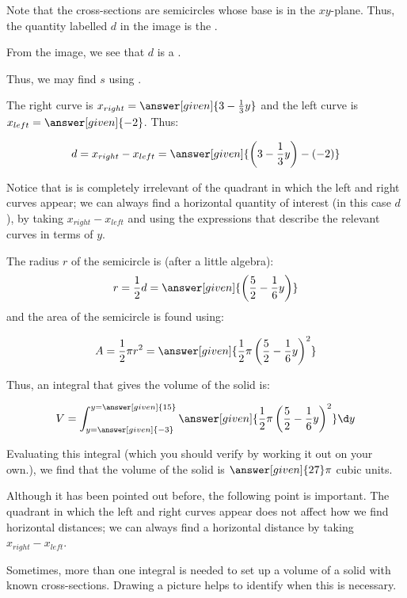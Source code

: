 \documentclass{ximera}
\begin{document}
\begin{example}
\begin{explanation}
Note that the cross-sections are semicircles whose base is in the $xy$-plane.  Thus, the quantity labelled $d$ in the image is the .

From the image, we see that $d$ is a .

Thus, we may find $s$ using .

The right curve is $x_{right} = \answer[given]{3-\frac{1}{3}y}$ and the left curve is $x_{left} = \answer[given]{-2}$.  Thus:

\[
d=x_{right}-x_{left} = \answer[given]{\left(3-\frac{1}{3} y \right)-(-2)}
\]

Notice that is is completely irrelevant of the quadrant in which the left and right curves appear; we can always find a horizontal quantity of interest (in this case $d$), by taking $x_{right}-x_{left}$ and using the expressions that describe the relevant curves in terms of $y$.
 
The radius $r$ of the semicircle is (after a little algebra):
\[
r = \frac{1}{2}d = \answer[given]{ \left(\frac{5}{2}-\frac{1}{6} y\right)}
\]
and the area of the semicircle is found using:

\[
A = \frac{1}{2} \pi r^2 = \answer[given]{\frac{1}{2} \pi\left(\frac{5}{2} - \frac{1}{6}y\right)^2}
\]

Thus, an integral that gives the volume of the solid is:

\[
V = \int_{y=\answer[given]{-3}}^{y=\answer[given]{15}} \answer[given]{\frac{1}{2} \pi\left(\frac{5}{2} - \frac{1}{6}y\right)^2} \d y
\]

Evaluating this integral (which you should verify by working it out on your own.), we find that the volume of the solid is $\answer[given]{27} \pi$ cubic units.
\end{explanation}

\begin{remark}
Although it has been pointed out before, the following point is important.  The quadrant in which the left and right curves appear does not affect how we find horizontal distances; we can always find a horizontal distance by taking $x_{right}-x_{left}$.  
\end{remark}
\end{example}

Sometimes, more than one integral is needed to set up a volume of a solid with known cross-sections.  Drawing a picture helps to identify when this is necessary.
\end{document}
